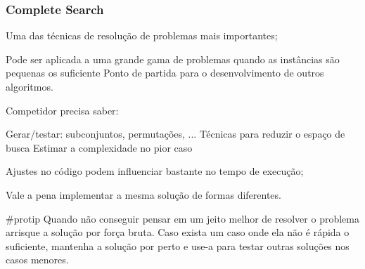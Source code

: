 \begin{frame}
\frametitle{Complete Search}

\begin{block}{}
\begin{itemize}
	\bitem Uma das técnicas de resolução de problemas mais importantes;
	\begin{itemize}
		\bitem Pode ser aplicada a uma grande gama de problemas quando as instâncias são pequenas os suficiente
		\bitem Ponto de partida para o desenvolvimento de outros algoritmos.
	\end{itemize}
	\bitem Competidor precisa saber:
	\begin{itemize}
		\bitem Gerar/testar: subconjuntos, permutações, ...
		\bitem Técnicas para reduzir o espaço de busca
		\bitem Estimar a complexidade no pior caso
	\end{itemize}
	\bitem Ajustes no código podem influenciar bastante no tempo de execução;
	\begin{itemize}
		\bitem Vale a pena implementar a mesma solução de formas diferentes.
	\end{itemize}
\end{itemize}	
\end{block}

\begin{block}{\tiny \#protip}
Quando não conseguir pensar em um jeito melhor de resolver o problema arrisque a solução por força bruta.
Caso exista um caso onde ela não é rápida o suficiente, mantenha a solução por perto e use-a para testar outras soluções nos casos menores.
\end{block}
\end{frame}




